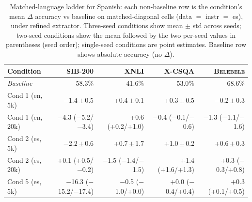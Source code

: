 \begin{table}[t]
  \centering
  \small
  \begin{tabular}{lrrrr}
    \toprule
    Condition & \textsc{SIB-200} & \textsc{XNLI} & \textsc{X-CSQA} & \textsc{Belebele} \\
    \midrule
    \textit{Baseline} & 58.3\% & 41.6\% & 53.0\% & 68.6\% \\
    Cond 1 (en, 5k) & $-$1.4\,$\pm$\,0.5 & +0.4\,$\pm$\,0.1 & +0.3\,$\pm$\,0.5 & $-$0.2\,$\pm$\,0.3 \\
    Cond 1 (en, 20k) & $-$4.3 ($-$5.2/$-$3.4) & +0.6 (+0.2/+1.0) & $-$0.4 ($-$0.1/$-$0.6) & $-$1.3 ($-$1.1/$-$1.6) \\
    Cond 2 (es, 5k) & $-$2.2\,$\pm$\,0.6 & +0.7\,$\pm$\,1.7 & +1.0\,$\pm$\,0.2 & +0.6\,$\pm$\,0.3 \\
    Cond 2 (es, 20k) & +0.1 (+0.5/$-$0.2) & $-$1.5 ($-$1.4/$-$1.5) & +1.4 (+1.6/+1.3) & +0.3 ($-$0.3/+0.8) \\
    Cond 5 (es, 5k) & $-$16.3 ($-$15.2/$-$17.4) & $-$0.5 ($-$1.0/+0.0) & +0.0 ($-$0.4/+0.4) & +0.3 (+0.1/+0.5) \\
    \bottomrule
  \end{tabular}
  \caption{Matched-language ladder for Spanish: each non-baseline row is the condition's mean $\Delta$ accuracy vs baseline on matched-diagonal cells (data $=$ instr $=$ es), under refined extractor. Three-seed conditions show mean $\pm$ std across seeds; two-seed conditions show the mean followed by the two per-seed values in parentheses (seed order); single-seed conditions are point estimates. Baseline row shows absolute accuracy (no $\Delta$).}
  \label{tab:matched-ladder-es}
\end{table}


